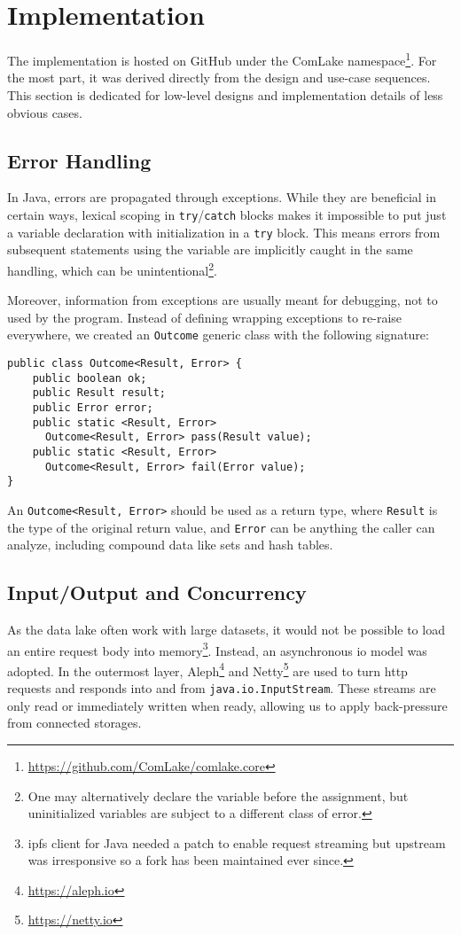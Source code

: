 \section{Implementation}
The implementation is hosted on GitHub under the ComLake
namespace\footnote{\url{https://github.com/ComLake/comlake.core}}.
For the most part, it was derived directly from the design
and use-case sequences.  This section is dedicated for low-level designs
and implementation details of less obvious cases.

\subsection{Error Handling}
In Java, errors are propagated through exceptions.  While they are beneficial
in certain ways, lexical scoping in \verb|try|/\verb|catch| blocks makes it
impossible to put just a variable declaration with initialization in
a \verb|try| block.  This means errors from subsequent statements using
the variable are implicitly caught in the same handling, which can
be unintentional\footnote{One may alternatively declare the variable before
the assignment, but uninitialized variables are subject to a different
class of error.}.

Moreover, information from exceptions are usually meant for debugging,
not to used by the program.  Instead of defining wrapping exceptions
to re-raise everywhere, we created an \verb|Outcome| generic class
with the following signature:
\begin{verbatim}
public class Outcome<Result, Error> {
    public boolean ok;
    public Result result;
    public Error error;
    public static <Result, Error>
      Outcome<Result, Error> pass(Result value);
    public static <Result, Error>
      Outcome<Result, Error> fail(Error value);
}
\end{verbatim}

An \verb|Outcome<Result, Error>| should be used as a return type,
where \verb|Result| is the type of the original return value, and \verb|Error|
can be anything the caller can analyze, including compound data like sets
and hash tables.

\subsection{Input/Output and Concurrency}\label{future}
As the data lake often work with large datasets, it would not be possible
to load an entire request body into memory\footnote{\gls{ipfs} client for Java
needed a patch to enable request streaming but upstream was irresponsive so a
fork has been maintained ever since.}.  Instead, an asynchronous \gls{io} model
was adopted.  In the outermost layer, Aleph\footnote{\url{https://aleph.io}}
and Netty\footnote{\url{https://netty.io}} are used to turn \gls{http}
requests and responds into and from \verb|java.io.InputStream|.  These streams
are only read or immediately written when ready, allowing us to apply
back-pressure from connected storages.

